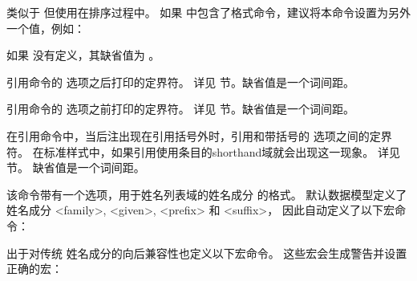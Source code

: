 \begin{ltxsyntax}
类似于  但使用在排序过程中。
如果  中包含了格式命令，建议将本命令设置为另外一个值，例如：

\begin{ltxexample}
\renewcommand*{\labelalphaothers}{\textbf{+}}
\renewcommand*{\sortalphaothers}{+}
\end{ltxexample}
%
如果  没有定义，其缺省值为 。

引用命令的  选项之后打印的定界符。
详见  节。缺省值是一个词间距。

引用命令的  选项之前打印的定界符。
详见  节。缺省值是一个词间距。

在引用命令中，当后注出现在引用括号外时，引用和带括号的  选项之间的定界符。
在标准样式中，如果引用使用条目的shorthand域就会出现这一现象。
详见  节。
缺省值是一个词间距。

该命令带有一个选项，用于姓名列表域的姓名成分  的格式。
默认数据模型定义了姓名成分 <family>, <given>, <prefix> 和 <suffix>，
因此自动定义了以下宏命令：

\begin{ltxexample}
\mkbibnamefamily
\mkbibnamegiven
\mkbibnameprefix
\mkbibnamesuffix
\end{ltxexample}
%
出于对传统 \BibTeX 姓名成分的向后兼容性也定义以下宏命令。
这些宏会生成警告并设置正确的宏：


\end{ltxsyntax}
